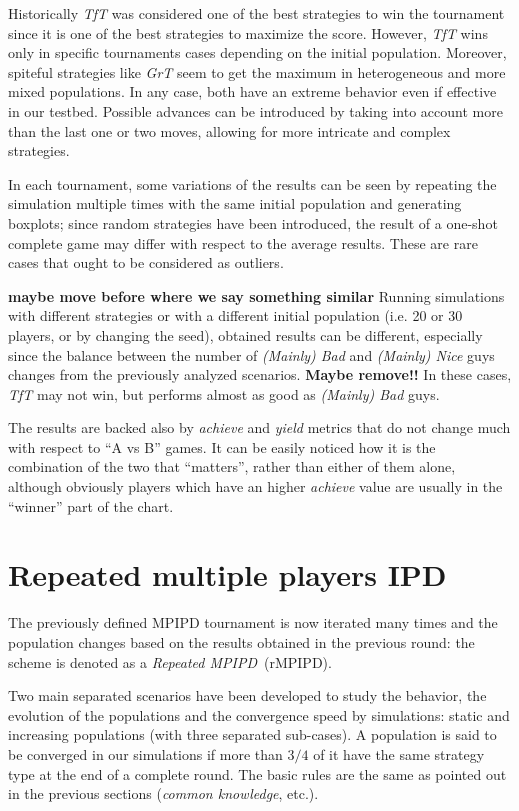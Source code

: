 \documentclass[journal,10pt,twoside]{IEEEtran}
\begin{document}
Historically \textit{TfT} was considered one of the best strategies to win the tournament since it is one of the best strategies to maximize the score. However, \textit{TfT} wins only in specific tournaments cases depending on the initial population. Moreover, spiteful strategies like \textit{GrT} seem to get the maximum in heterogeneous and more mixed populations. In any case, both have an extreme behavior even if effective in our testbed. Possible advances can be introduced by taking into account more than the last one or two moves, allowing for more intricate and complex strategies.~\cite{mathieu2017}

In each tournament, some variations of the results can be seen by repeating the simulation multiple times with the same initial population and generating boxplots; since random strategies have been introduced, the result of a one-shot complete game may differ with respect to the average results. These are rare cases that ought to be considered as outliers.

\textbf{maybe move before where we say something similar} Running simulations with different strategies or with a different initial population (i.e. 20 or 30 players, or by changing the seed), obtained results can be different, especially since the balance between the number of \textit{(Mainly) Bad} and \textit{(Mainly) Nice} guys changes from the previously analyzed scenarios. \textbf{Maybe remove!!} In these cases, \textit{TfT} may not win, but performs almost as good as \textit{(Mainly) Bad} guys.

The results are backed also by \textit{achieve} and \textit{yield} metrics that do not change much with respect to ``A vs B'' games.
It can be easily noticed how it is the combination of the two that ``matters'', rather than either of them alone, although obviously players which have an higher \textit{achieve} value are usually in the ``winner'' part of the chart.

\section{Repeated multiple players IPD} \label{s:rIPDMP}
The previously defined MPIPD tournament is now iterated many times and the population changes based on the results obtained in the previous round: the scheme is denoted as a \textit{Repeated MPIPD}~(rMPIPD).

Two main separated scenarios have been developed to study the behavior, the evolution of the populations and the convergence speed by simulations: static and increasing populations (with three separated sub-cases). A population is said to be converged in our simulations if more than $3/4$ of it have the same strategy type at the end of a complete round. The basic rules are the same as pointed out in the previous sections (\textit{common knowledge},  etc.).
\end{document}
